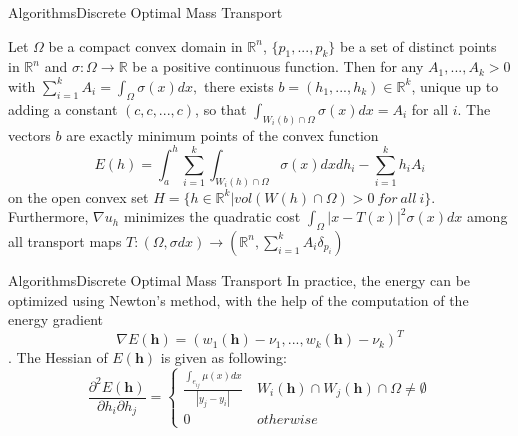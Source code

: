 \documentclass{beamer}
\theoremstyle{definition}
\begin{document}
\begin{frame}{Algorithms}{Discrete Optimal Mass Transport}
\begin{theorem}
Let $\Omega$ be a compact convex domain in $\mathbb{R}^n$, $\{p_1,...,p_k\}$ be a set of distinct points in $\mathbb{R}^n$ and $\sigma:\Omega\rightarrow \mathbb{R}$ be a positive continuous function. Then for any $A_1,...,A_k>0$ with $\sum^k_{i=1}A_i=\int_{\Omega}\sigma(x)dx,$ there exists $b=(h_1,...,h_k)\in \mathbb{R}^k$, unique up to adding a constant $(c,c,...,c)$, so that $\int_{W_i(b)\cap \Omega}\sigma(x)dx=A_i$ for all $i$. The vectors $b$ are exactly minimum points of the convex function $$E(h)=\int^h_a\sum^k_{i=1}\int_{W_i(h)\cap\Omega}\sigma(x)dxdh_i-\sum^k_{i=1}h_iA_i$$ on the open convex set $H=\{h\in\mathbb{R}^k|vol(W(h)\cap \Omega)>0\ for\ all\ i\}$. Furthermore, $\nabla u_h$ minimizes the quadratic cost $\int_\Omega|x-T(x)|^2\sigma(x)dx$ among all transport maps $T:(\Omega,\sigma dx)\rightarrow(\mathbb{R}^n,\sum^k_{i=1}A_i\delta_{p_i})$
\end{theorem}
\end{frame}

\begin{frame}{Algorithms}{Discrete Optimal Mass Transport}
In practice, the energy can be optimized using Newton's method, with the help of the computation of the energy gradient $$\nabla E(\mathbf{h})=(w_1(\mathbf{h})-\nu_1,...,w_k(\mathbf{h})-\nu_k)^T$$. The Hessian of $E(\mathbf{h})$ is given as following:
\[
\dfrac{\partial ^2E(\mathbf{h})}{\partial h_i\partial h_j}=\begin{cases}
					\frac{\int_{e_{ij}}\mu(x)dx}{|y_j-y_i|}\ &W_i(\mathbf{h})\cap W_j(\mathbf{h})\cap \Omega\neq\emptyset \\
					0 &otherwise
\end{cases}
\]
\end{frame}
\end{document}
